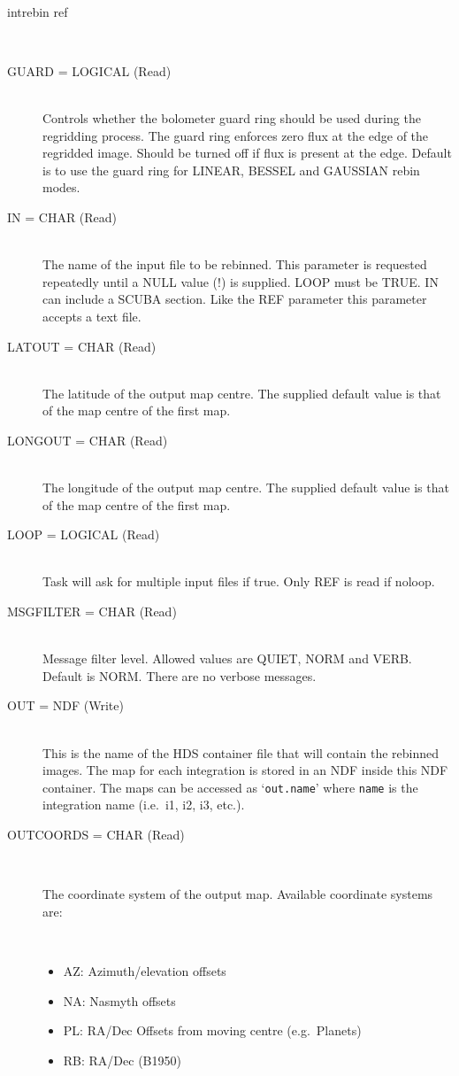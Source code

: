 \documentclass[twoside,11pt]{article}
\newcommand{\htmlref}[2]{#1}
\renewcommand{\_}{\texttt{\symbol{95}}}
\newcommand{\sstusage}[1]{\item[Usage:] \mbox{}
\\[1.3ex]{\raggedright \ssttt #1}}
\newcommand{\sstparameters}[1]{
   \item[Parameters:] \mbox{} \\
   \vspace{-3.5ex}
   \begin{description}
      #1
   \end{description}
}
\newcommand{\sstsubsection}[1]{ \item[{#1}] \mbox{} \\}
\newcommand{\sstitemlist}[1]{
  \mbox{} \\
  \vspace{-3.5ex}
  \begin{itemize}
     #1
  \end{itemize}
}
\newcommand{\sstitem}{\item}
\newcommand{\sstusage}[1]{\item[Usage:]
      \begin{description}
         {\ssttt #1}
      \end{description}
      \\
   }
\newcommand{\sstparameters}[1]{
      \item[Parameters:] \\
      \begin{description}
         #1
      \end{description}
      \\
   }
\newcommand{\sstsubsection}[1]{\item[{#1}]}
\newcommand{\sstitemlist}[1]{
      \begin{itemize}
         #1
      \end{itemize}
      \\
   }
\newcommand{\sstitem}{\item}
\begin{document}
{{{      }
   }
   \sstusage{
      intrebin ref
   }
   \sstparameters{
      \sstsubsection{
         GUARD = LOGICAL (Read)
      }{
            Controls whether the bolometer guard ring should be used during
   the regridding process. The guard ring enforces zero flux at the
   edge of the regridded image. Should be turned off if flux is present
   at the edge. Default is to use the guard ring for LINEAR, BESSEL
   and GAUSSIAN rebin modes.
      }
      \sstsubsection{
         IN = CHAR (Read)
      }{
         The name of the input file to be rebinned. This parameter is requested
         repeatedly until a NULL value (!) is supplied. LOOP must be TRUE.
         IN can include a \htmlref{SCUBA section}{sections}.
         Like the REF parameter this parameter accepts a text file.
      }
      \sstsubsection{
         LAT\_OUT = CHAR (Read)
      }{
         The latitude of the output map centre. The supplied default value
         is that of the map centre of the first map.
      }
      \sstsubsection{
         LONG\_OUT = CHAR (Read)
      }{
         The longitude of the output map centre. The supplied default value
         is that of the map centre of the first map.
      }
      \sstsubsection{
         LOOP = LOGICAL (Read)
      }{
         Task will ask for multiple input files if true. Only REF is read
         if noloop.
      }
      \sstsubsection{
         MSG\_FILTER = CHAR (Read)
      }{
         Message filter level. Allowed values are QUIET, NORM and VERB.
         Default is NORM. There are no verbose messages.
      }
      \sstsubsection{
         OUT = NDF (Write)
      }{
        This is the name of the HDS container file that will contain the
        rebinned images. The map for each integration is stored in an NDF
        inside this NDF container. The maps can be accessed as 
        `\texttt{out.name}' where \texttt{name} is the integration name (i.e.\
         i1, i2, i3, etc.).
      }
      \sstsubsection{
         OUT\_COORDS = CHAR (Read)
      }{
         The coordinate system of the output map. Available coordinate
         systems are:
         \sstitemlist{

            \sstitem
            AZ:  Azimuth/elevation offsets

            \sstitem
            NA:  Nasmyth offsets

            \sstitem
            PL:  RA/Dec Offsets from moving centre (e.g.\ Planets)

            \sstitem
            RB:  RA/Dec (B1950)

}}}}
\end{document}
